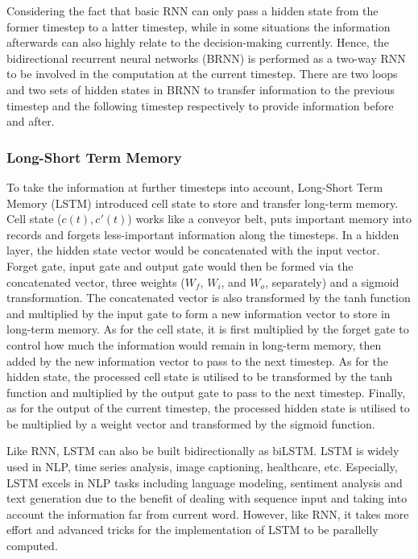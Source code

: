 Considering the fact that basic RNN can only pass a hidden state from the former timestep to a latter timestep, while in some situations the information afterwards can also highly relate to the decision-making currently.
Hence, the bidirectional recurrent neural networks (BRNN)\cite{schuster1997bidirectional} is performed as a two-way RNN to be involved in the computation at the current timestep.
There are two loops and two sets of hidden states in BRNN to transfer information to the previous timestep and the following timestep respectively to provide information before and after.

\subsubsection{Long-Short Term Memory}
To take the information at further timesteps into account, Long-Short Term Memory (LSTM) introduced cell state to store and transfer long-term memory.
Cell state ($c(t), c'(t)$) works like a conveyor belt, puts important memory into records and forgets less-important information along the timesteps.
In a hidden layer, the hidden state vector would be concatenated with the input vector.
Forget gate, input gate and output gate would then be formed via the concatenated vector, three weights ($W_f$, $W_i$, and $W_o$, separately) and a sigmoid transformation.
The concatenated vector is also transformed by the tanh function and multiplied by the input gate to form a new information vector to store in long-term memory.
As for the cell state, it is first multiplied by the forget gate to control how much the information would remain in long-term memory, then added by the new information vector to pass to the next timestep.
As for the hidden state, the processed cell state is utilised to be transformed by the tanh function and multiplied by the output gate to pass to the next timestep.
Finally, as for the output of the current timestep, the processed hidden state is utilised to be multiplied by a weight vector and transformed by the sigmoid function.

Like RNN, LSTM can also be built bidirectionally as biLSTM\cite{graves2013hybrid}.
LSTM is widely used in NLP\cite{wang-nyberg-2015-long}, time series analysis\cite{selvin2017stock}, image captioning\cite{vinyals2015show}, healthcare\cite{rajkomar2018scalable}, etc.
Especially, LSTM excels in NLP tasks including language modeling\cite{sundermeyer2012lstm}, sentiment analysis\cite{wang2016attention} and text generation\cite{guo2018long} due to the benefit of dealing with sequence input and taking into account the information far from current word.
However, like RNN, it takes more effort and advanced tricks for the implementation of LSTM to be parallelly computed\cite{yangyang2021research}.

